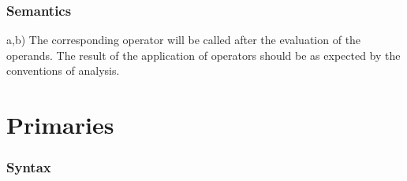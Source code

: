 \documentclass [a4paper,12pt,fleqn]{article}
\begin{document}
\subsubsection*{Semantics}
\begin{list}{-}{}
\item[a,b)]
The corresponding operator will be called after the evaluation of
the operands. The result of the application of operators should be
as expected by the conventions of analysis.
\end{list}
\section {Primaries}
\subsubsection*{Syntax}
\end{document}
